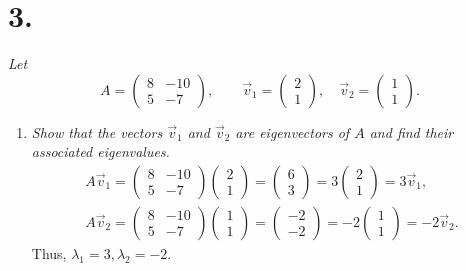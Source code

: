 \documentclass[12pt]{article}
\begin{document}
\section*{3.}
\textit{Let}
\begin{equation*}
	A = \begin{pmatrix} 8 & -10 \\ 5 & -7 \end{pmatrix},
	\qquad
	\vec{v}_1 = \begin{pmatrix} 2 \\ 1 \end{pmatrix}, \quad
	\vec{v}_2 = \begin{pmatrix} 1 \\ 1 \end{pmatrix}.
\end{equation*}
\begin{enumerate}[label=(\alph*)]
	\item \textit{Show that the vectors $\vec{v}_1$ and $\vec{v}_2$ are
	eigenvectors of $A$ and find their associated eigenvalues.}
	\begin{gather*}
		A \vec{v}_1
		=
		\begin{pmatrix} 8 & -10 \\ 5 & -7 \end{pmatrix}
		\begin{pmatrix} 2 \\ 1 \end{pmatrix}
		=
		\begin{pmatrix} 6 \\ 3 \end{pmatrix}
		=
		3 \begin{pmatrix} 2 \\ 1 \end{pmatrix}
		=
		3 \vec{v}_1
		, \\
		A \vec{v}_2
		=
		\begin{pmatrix} 8 & -10 \\ 5 & -7 \end{pmatrix}
		\begin{pmatrix} 1 \\ 1 \end{pmatrix}
		=
		\begin{pmatrix} -2 \\ -2 \end{pmatrix}
		=
		-2 \begin{pmatrix} 1 \\ 1 \end{pmatrix}
		=
		-2 \vec{v}_2
		.
	\end{gather*}
	Thus, $\boxed{\lambda_1 = 3}, \boxed{\lambda_2 = -2}$.
	

\end{enumerate}
\end{document}
